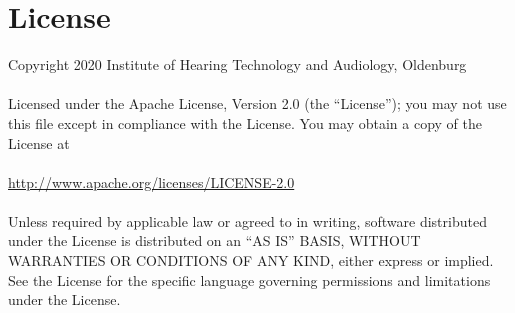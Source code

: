 \documentclass[11pt,a4paper,titlepage]{article}
\newcommand{\Institute}{Institute of Hearing Technology and Audiology, Oldenburg}
\begin{document}
\clearpage

 
\section{License}

 Copyright 2020 \Institute\\
\\
   Licensed under the Apache License, Version 2.0 (the ``License'');
   you may not use this file except in compliance with the License.
   You may obtain a copy of the License at\\
\\
	 \url{http://www.apache.org/licenses/LICENSE-2.0}\\
\\
   Unless required by applicable law or agreed to in writing, software
   distributed under the License is distributed on an ``AS IS'' BASIS,
   WITHOUT WARRANTIES OR CONDITIONS OF ANY KIND, either express or implied.
   See the License for the specific language governing permissions and
   limitations under the License.
\end{document}
